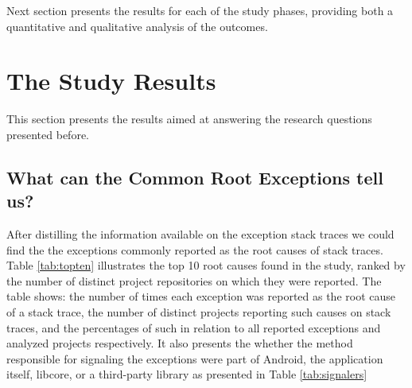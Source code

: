 \documentclass[conference]{IEEEtran}
\begin{document}
Next section presents the results for each of the study phases, providing both a
quantitative and qualitative analysis of the outcomes.

\section{The Study Results}
\label{sec:result}


This section presents the results aimed at answering the research 
questions presented before.

\subsection{What can the Common Root Exceptions tell us? }

After distilling the information available on the exception stack traces we could find 
the the exceptions commonly reported as the root causes of stack traces.
Table \ref{tab:topten} illustrates the top 10 root causes found in the study,
 ranked by the number of distinct project repositories on which they were reported. 
The table shows: the number of times each exception was reported as 
the root cause of a stack trace, the number of distinct projects reporting such causes on stack traces, 
and the percentages of such in relation to all reported exceptions and analyzed projects respectively.
It also presents the whether the method responsible for signaling the exceptions were
part of Android, the application itself, libcore, or a third-party library as presented in Table  \ref{tab:signalers} 


\end{document}
